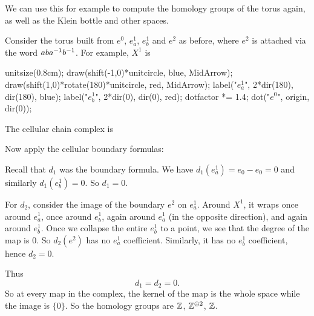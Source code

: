 We can use this for example to compute the homology groups of the torus again,
as well as the Klein bottle and other spaces.

\begin{example}
	Consider the torus built from $e^0$, $e^1_a$, $e^1_b$ and $e^2$ as before,
	where $e^2$ is attached via the word $aba^{-1} b^{-1}$.
	For example, $X^1$ is
	\begin{center}
		\begin{asy}
			unitsize(0.8cm);
			draw(shift(-1,0)*unitcircle, blue, MidArrow);
			draw(shift(1,0)*rotate(180)*unitcircle, red, MidArrow);
			label("$e^1_a$", 2*dir(180), dir(180), blue);
			label("$e^1_b$", 2*dir(0), dir(0), red);
			dotfactor *= 1.4;
			dot("$e^0$", origin, dir(0));
		\end{asy}
	\end{center}
	The cellular chain complex is
	\begin{center}
	\end{center}
	Now apply the cellular boundary formulas:
	\begin{itemize}
		\ii Recall that $d_1$ was the boundary formula.
		We have $d_1(e^1_a) = e_0 - e_0 = 0$ and similarly $d_1(e^1_b) = 0$.
		So $d_1 = 0$.

		\ii For $d_2$, consider the image of the boundary $e^2$ on $e^1_a$.
		Around $X^1$, it wraps once around $e^1_a$, once around $e^1_b$,
		again around $e^1_a$ (in the opposite direction),
		and again around $e^1_b$.
		Once we collapse the entire $e^1_b$ to a point,
		we see that the degree of the map is $0$.
		So $d_2(e^2)$ has no $e^1_a$ coefficient.
		Similarly, it has no $e^1_b$ coefficient, hence $d_2 = 0$.
	\end{itemize}
	Thus \[ d_1=d_2=0. \]
	So at every map in the complex, the kernel of the map
	is the whole space while the image is $\{0\}$.
	So the homology groups are $\mathbb Z$, $\mathbb Z^{\oplus 2}$, $\mathbb Z$.
\end{example}
